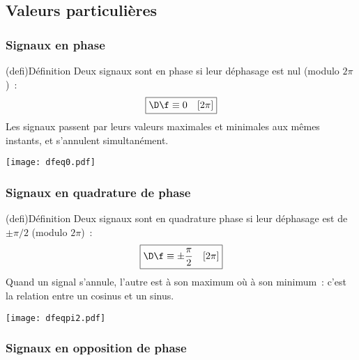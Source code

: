 \documentclass[../../main/main.tex]{subfiles}
\begin{document}
\subsection{Valeurs particulières}
\subsubsection{Signaux en phase}
\begin{minipage}{0.70\linewidth}
	\begin{tcb}(defi){\small Définition}
		Deux signaux sont en phase si leur déphasage est nul (modulo $2\pi$)~:
		\[\boxed{\D\f \equiv 0\quad[2\pi]}\]
		Les signaux passent par leurs valeurs maximales et minimales aux mêmes
		instants, et s'annulent simultanément.
	\end{tcb}
\end{minipage}
\hfill
\begin{minipage}{0.30\linewidth}
	\begin{center}
		\texttt{[image: dfeq0.pdf]}
	\end{center}
\end{minipage}

\vspace{-20pt}
\subsubsection{Signaux en quadrature de phase}

\begin{minipage}{0.70\linewidth}
	\begin{tcb}(defi){\small Définition}
		Deux signaux sont en quadrature phase si leur déphasage est de
		$\pm\pi/2$ (modulo $2\pi$)~:
		\[\boxed{\D\f \equiv \pm\frac{\pi}{2} \quad[2\pi]}\]
		Quand un signal s'annule, l'autre est à son maximum où à son minimum~:
		c'est la relation entre un cosinus et un sinus.
	\end{tcb}
\end{minipage}
\hfill
\begin{minipage}{0.30\linewidth}
	\begin{center}
		\texttt{[image: dfeqpi2.pdf]}
	\end{center}
\end{minipage}

\subsubsection{Signaux en opposition de phase}
\end{document}
